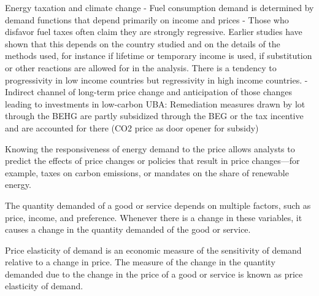 \documentclass[12pt,twoside]{reedthesis}
\begin{document}
Energy taxation and climate change
- Fuel consumption demand is determined by demand functions that depend primarily on income and prices
- Those who disfavor fuel taxes often claim they are strongly regressive. Earlier studies have shown that this depends on the country studied and on the details of the methods used, for instance if lifetime or temporary income is used, if substitution or other reactions are allowed for in the analysis. There is a tendency to progressivity in low income countries but regressivity in high income countries.
- Indirect channel of long-term price change and anticipation of those changes leading to investments in low-carbon UBA: Remediation measures drawn by lot through the BEHG are partly subsidized through the BEG or the tax incentive and are accounted for there (CO2 price as door opener for subsidy)

Knowing the responsiveness of energy demand to the price allows analysts to predict the effects of price changes or policies that result in price changes---for example, taxes on carbon emissions, or mandates on the share of renewable energy.

The quantity demanded of a good or service depends on multiple factors, such as price, income, and preference. Whenever there is a change in these variables, it causes a change in the quantity demanded of the good or service.

Price elasticity of demand is an economic measure of the sensitivity of demand relative to a change in price. The measure of the change in the quantity demanded due to the change in the price of a good or service is known as price elasticity of demand.
\end{document}
